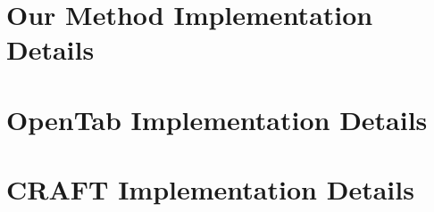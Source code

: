 
\label{sec:implementation_detail}
\section{Our Method Implementation Details}
\section{OpenTab Implementation Details}
\section{CRAFT Implementation Details}
 
